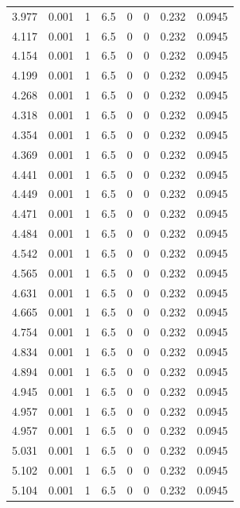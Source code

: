 \documentclass[preview]{standalone}
\begin{document}
{{{\begin{tabular}{L{1.2cm}C{1.2cm} C{0.3cm}C{0.5cm} C{1.4cm}C{1.4cm} C{1.4cm}C{1.4cm}}
  3.977  &  0.001  & 1     & 6.5 &  0  & 0  & 0.232 &  0.0945   \\ 
  4.117  &  0.001  & 1     & 6.5 &  0  & 0  & 0.232 &  0.0945   \\ 
  4.154  &  0.001  & 1     & 6.5 &  0  & 0  & 0.232 &  0.0945   \\ 
  4.199  &  0.001  & 1     & 6.5 &  0  & 0  & 0.232 &  0.0945   \\ 
  4.268  &  0.001  & 1     & 6.5 &  0  & 0  & 0.232 &  0.0945   \\ 
  4.318  &  0.001  & 1     & 6.5 &  0  & 0  & 0.232 &  0.0945   \\ 
  4.354  &  0.001  & 1     & 6.5 &  0  & 0  & 0.232 &  0.0945   \\ 
  4.369  &  0.001  & 1     & 6.5 &  0  & 0  & 0.232 &  0.0945   \\ 
  4.441  &  0.001  & 1     & 6.5 &  0  & 0  & 0.232 &  0.0945   \\ 
  4.449  &  0.001  & 1     & 6.5 &  0  & 0  & 0.232 &  0.0945   \\ 
  4.471  &  0.001  & 1     & 6.5 &  0  & 0  & 0.232 &  0.0945   \\ 
  4.484  &  0.001  & 1     & 6.5 &  0  & 0  & 0.232 &  0.0945   \\ 
  4.542  &  0.001  & 1     & 6.5 &  0  & 0  & 0.232 &  0.0945   \\ 
  4.565  &  0.001  & 1     & 6.5 &  0  & 0  & 0.232 &  0.0945   \\ 
  4.631  &  0.001  & 1     & 6.5 &  0  & 0  & 0.232 &  0.0945   \\ 
  4.665  &  0.001  & 1     & 6.5 &  0  & 0  & 0.232 &  0.0945   \\ 
  4.754  &  0.001  & 1     & 6.5 &  0  & 0  & 0.232 &  0.0945   \\ 
  4.834  &  0.001  & 1     & 6.5 &  0  & 0  & 0.232 &  0.0945   \\ 
  4.894  &  0.001  & 1     & 6.5 &  0  & 0  & 0.232 &  0.0945   \\ 
  4.945  &  0.001  & 1     & 6.5 &  0  & 0  & 0.232 &  0.0945   \\ 
  4.957  &  0.001  & 1     & 6.5 &  0  & 0  & 0.232 &  0.0945   \\ 
  4.957  &  0.001  & 1     & 6.5 &  0  & 0  & 0.232 &  0.0945   \\ 
  5.031  &  0.001  & 1     & 6.5 &  0  & 0  & 0.232 &  0.0945   \\ 
  5.102  &  0.001  & 1     & 6.5 &  0  & 0  & 0.232 &  0.0945   \\ 
  5.104  &  0.001  & 1     & 6.5 &  0  & 0  & 0.232 &  0.0945   \\ 
\hline 
\end{tabular} 

}}}
\end{document}
